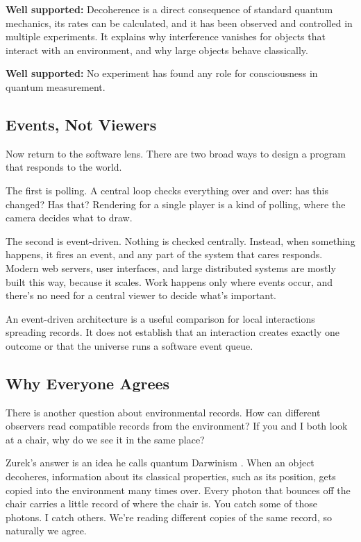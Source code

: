 \begin{researchnotebox}
\textbf{Well supported:} Decoherence is a direct consequence of standard quantum mechanics, its rates can be calculated, and it has been observed and controlled in multiple experiments. It explains why interference vanishes for objects that interact with an environment, and why large objects behave classically.

\textbf{Well supported:} No experiment has found any role for consciousness in quantum measurement.
\end{researchnotebox}

\subsection{Events, Not Viewers}

Now return to the software lens. There are two broad ways to design a program that responds to the world.

The first is polling. A central loop checks everything over and over: has this changed? Has that? Rendering for a single player is a kind of polling, where the camera decides what to draw.

The second is event-driven. Nothing is checked centrally. Instead, when something happens, it fires an event, and any part of the system that cares responds. Modern web servers, user interfaces, and large distributed systems are mostly built this way, because it scales. Work happens only where events occur, and there's no need for a central viewer to decide what's important.

An event-driven architecture is a useful comparison for local interactions spreading records. It does not establish that an interaction creates exactly one outcome or that the universe runs a software event queue.

\subsection{Why Everyone Agrees}

There is another question about environmental records. How can different observers read compatible records from the environment? If you and I both look at a chair, why do we see it in the same place?

Zurek's answer is an idea he calls quantum Darwinism \cite{zurek2009}. When an object decoheres, information about its classical properties, such as its position, gets copied into the environment many times over. Every photon that bounces off the chair carries a little record of where the chair is. You catch some of those photons. I catch others. We're reading different copies of the same record, so naturally we agree.

